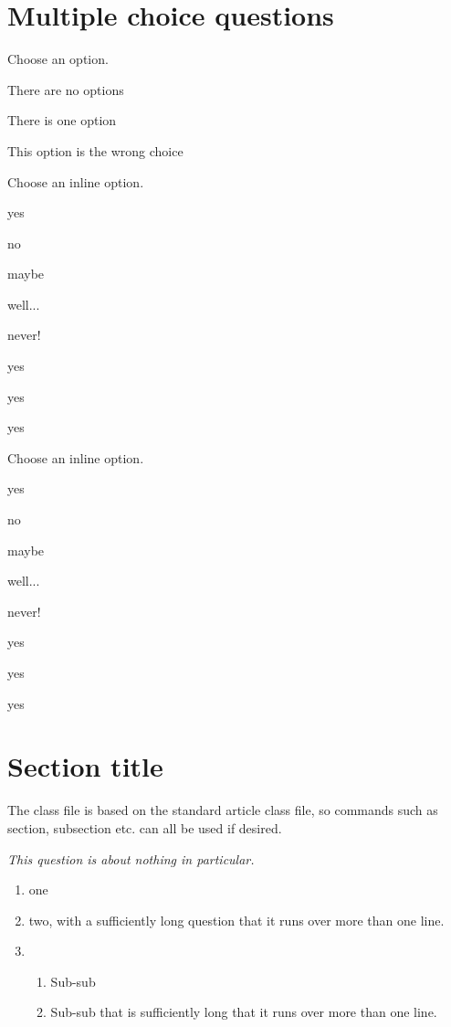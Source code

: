 \documentclass[remote,showsolutions]{ouexam}
\begin{document}
\section{Multiple choice questions}


\question
Choose an option.
\begin{options}
\item There are no options
\item There is one option
\item This option is the wrong choice
\end{options}


\question
Choose an inline option.
\begin{inlineoptions}{5} %
\item yes
\item no
\item maybe
\item well...
\item never!
\item yes
\item yes
\item yes
\noitem %
\noitem{}
\end{inlineoptions}

\question
Choose an inline option.
\begin{inlineoptions}[1.5]{3} %
\item yes
\item no
\item maybe
\item well...
\item never!
\item yes
\item yes
\item yes
\noitem %
\end{inlineoptions}

\section{Section title}

The class file is based on the standard article class file, so commands such as section, subsection etc. can all be used if desired.


\question
\emph{This question is about nothing in particular.}
\begin{enumerate}
\item one
\item two, with a sufficiently long question that it runs over more than one line.
\item 
\begin{enumerate}
\item Sub-sub
\item Sub-sub that is sufficiently long that it runs over more than one line.
\end{enumerate}
\end{enumerate}
\end{document}
